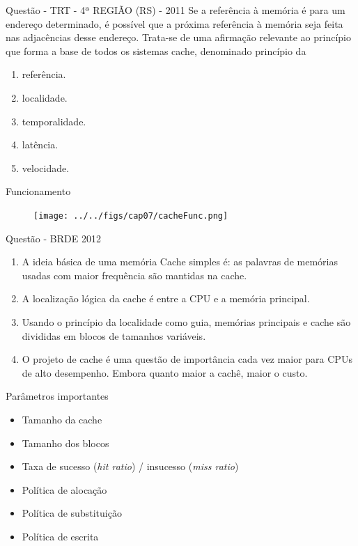 \documentclass[aspectratio=169,
				xcolor=table]{beamer}
\begin{document}
	\begin{frame}{Questão - TRT - 4ª REGIÃO (RS) - 2011 }
	Se a referência à memória é para um endereço determinado, é possível que a próxima referência à memória seja feita nas adjacências desse endereço. Trata-se de uma afirmação relevante ao princípio que forma a base de todos os sistemas cache, denominado princípio da 

	\begin{enumerate}[a]
		\item referência.
		\item localidade.
		\item temporalidade.
		\item latência.
		\item velocidade.	
	\end{enumerate}

	
	
	\end{frame}
	
	\begin{frame}{Funcionamento}
		\begin{figure}[hbtp]
			\centering
			\texttt{[image: ../../figs/cap07/cacheFunc.png]}
		\end{figure}
	\end{frame}

	\begin{frame}{Questão - BRDE 2012}
		\begin{enumerate}[I]
			\item A ideia básica de uma memória Cache simples é: as palavras de memórias usadas com maior frequência são mantidas na cache. 
			\item A localização lógica da cache é entre a CPU e a memória principal. 
			\item Usando o princípio da localidade como guia, memórias principais e cache são divididas em blocos de tamanhos variáveis. 
			\item O projeto de cache é uma questão de importância cada vez maior para CPUs de alto desempenho. Embora quanto maior a cachê, maior o custo. 
		
		\end{enumerate}


	\end{frame}

	
	\begin{frame}{Parâmetros importantes}
		\begin{itemize}
			\item Tamanho da cache
			\item Tamanho dos blocos
			\item Taxa de sucesso (\textit{hit ratio}) / insucesso (\textit{miss ratio})
			\item Política de alocação
			\item Política de substituição
			\item Política de escrita
		\end{itemize}
	\end{frame}
	
\end{document}
